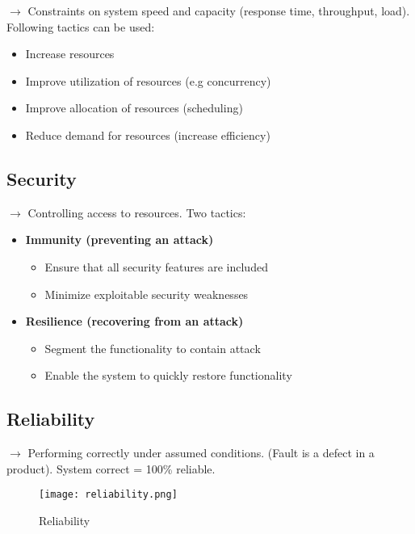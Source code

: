 $\rightarrow$ Constraints on system speed and capacity (response time, throughput, load).
Following tactics can be used:
\begin{itemize}
	\item Increase resources
	\item Improve utilization of resources (e.g concurrency)
	\item Improve allocation of resources (scheduling)
	\item Reduce demand for resources (increase efficiency)
\end{itemize}


\subsection{Security}
$\rightarrow$ Controlling access to resources. Two tactics:

\begin{itemize}
    \item \textbf{Immunity (preventing an attack)}
        \begin{itemize}
            \item Ensure that all security features are included
            \item Minimize exploitable security weaknesses
        \end{itemize}

    \item \textbf{Resilience (recovering from an attack)}
        \begin{itemize}
            \item Segment the functionality to contain attack
            \item Enable the system to quickly restore functionality
        \end{itemize}
\end{itemize}

\subsection{Reliability}

$\rightarrow$ Performing correctly \textcolor{red!80!black}{under assumed conditions}. (Fault is a
defect in a product). System correct = 100\% reliable.

\begin{figure}[!ht]
    \centering
    \texttt{[image: reliability.png]}
    \caption{Reliability}
\end{figure}

